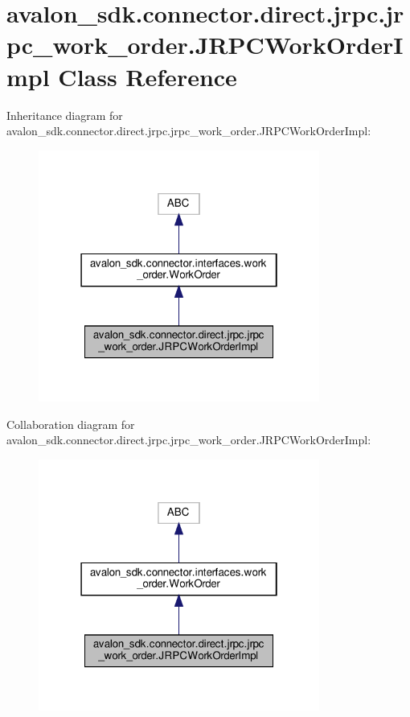 \hypertarget{classavalon__sdk_1_1connector_1_1direct_1_1jrpc_1_1jrpc__work__order_1_1JRPCWorkOrderImpl}{}\section{avalon\+\_\+sdk.\+connector.\+direct.\+jrpc.\+jrpc\+\_\+work\+\_\+order.\+J\+R\+P\+C\+Work\+Order\+Impl Class Reference}
\label{classavalon__sdk_1_1connector_1_1direct_1_1jrpc_1_1jrpc__work__order_1_1JRPCWorkOrderImpl}


Inheritance diagram for avalon\+\_\+sdk.\+connector.\+direct.\+jrpc.\+jrpc\+\_\+work\+\_\+order.\+J\+R\+P\+C\+Work\+Order\+Impl\+:
\nopagebreak
\begin{figure}[H]
\begin{center}
\leavevmode
\includegraphics[width=262pt]{classavalon__sdk_1_1connector_1_1direct_1_1jrpc_1_1jrpc__work__order_1_1JRPCWorkOrderImpl__inherit__graph}
\end{center}
\end{figure}


Collaboration diagram for avalon\+\_\+sdk.\+connector.\+direct.\+jrpc.\+jrpc\+\_\+work\+\_\+order.\+J\+R\+P\+C\+Work\+Order\+Impl\+:
\nopagebreak
\begin{figure}[H]
\begin{center}
\leavevmode
\includegraphics[width=262pt]{classavalon__sdk_1_1connector_1_1direct_1_1jrpc_1_1jrpc__work__order_1_1JRPCWorkOrderImpl__coll__graph}
\end{center}
\end{figure}
